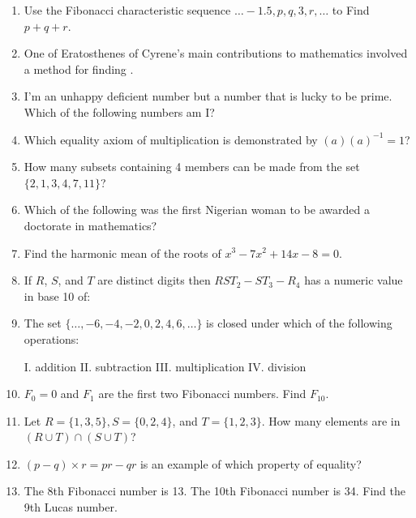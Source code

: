 \documentclass[../uilmath.tex]{subfiles}
\begin{document}
\begin{enumerate}[label=\bfseries\arabic*.]
    \item %
    Use the Fibonacci characteristic sequence $\dots -1.5,p,q,3,r,\dots$ to Find $p+q+r$.

    \item %
    One of Eratosthenes of Cyrene's main contributions to mathematics involved a method for finding \blank .

    \item %
    I'm an unhappy deficient number but a number that is lucky to be prime. Which of the following numbers am I?

    \item %
    Which equality axiom of multiplication is demonstrated by $(a)(a)^{-1}=1$?

    \item %
    How many subsets containing 4 members can be made from the set $\{2,1,3,4,7,11\}$?

    \item %
    Which of the following was the first Nigerian woman to be awarded a doctorate in mathematics?

    \item %
    Find the harmonic mean of the roots of $x^3-7x^2+14x-8=0$.

    \item %
    If $R$, $S$, and $T$ are distinct digits then $RST_2-ST_3-R_4$ has a numeric value in base 10 of:

    \item %
    The set $\{\dots, -6, -4,-2,0,2,4,6,\dots\}$ is closed under which of the following operations:
    \begin{center}
        I. addition \qquad II. subtraction \qquad III. multiplication \qquad IV. division 
    \end{center}

    \item %
    $F_0=0$ and $F_1$ are the first two Fibonacci numbers. Find $F_{10}$.

    \item %
    Let $R=\{1,3,5\}, S=\{0,2,4\}$, and $T=\{1,2,3\}$. How many elements are in $(R\cup T)\cap(S\cup T)$?

    \item %
    $(p-q)\times r = pr-qr$ is an example of which property of equality?

    \item %
    The 8th Fibonacci number is 13. The 10th Fibonacci number is 34. Find the 9th Lucas number.


\end{enumerate}
\end{document}

